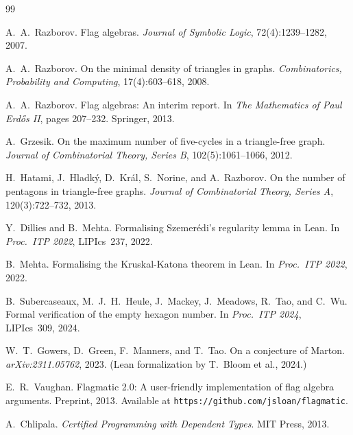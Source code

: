 \documentclass{article}
\begin{document}

\begin{thebibliography}{99}

A.~A.~Razborov.
\newblock Flag algebras.
\newblock \textit{Journal of Symbolic Logic}, 72(4):1239--1282, 2007.

A.~A.~Razborov.
\newblock On the minimal density of triangles in graphs.
\newblock \textit{Combinatorics, Probability and Computing},
  17(4):603--618, 2008.

A.~A.~Razborov.
\newblock Flag algebras: An interim report.
\newblock In \textit{The Mathematics of Paul Erd\H{o}s II}, pages 207--232.
  Springer, 2013.

A.~Grzesik.
\newblock On the maximum number of five-cycles in a triangle-free graph.
\newblock \textit{Journal of Combinatorial Theory, Series B},
  102(5):1061--1066, 2012.

H.~Hatami, J.~Hladk\'{y}, D.~Kr\'{a}l, S.~Norine, and A.~Razborov.
\newblock On the number of pentagons in triangle-free graphs.
\newblock \textit{Journal of Combinatorial Theory, Series A},
  120(3):722--732, 2013.

Y.~Dillies and B.~Mehta.
\newblock Formalising Szemer\'{e}di's regularity lemma in Lean.
\newblock In \textit{Proc.\ ITP 2022}, LIPIcs~237, 2022.

B.~Mehta.
\newblock Formalising the Kruskal-Katona theorem in Lean.
\newblock In \textit{Proc.\ ITP 2022}, 2022.

B.~Subercaseaux, M.~J.~H.~Heule, J.~Mackey, J.~Meadows, R.~Tao, and
  C.~Wu.
\newblock Formal verification of the empty hexagon number.
\newblock In \textit{Proc.\ ITP 2024}, LIPIcs~309, 2024.

W.~T.~Gowers, D.~Green, F.~Manners, and T.~Tao.
\newblock On a conjecture of Marton.
\newblock \textit{arXiv:2311.05762}, 2023.
\newblock (Lean formalization by T.~Bloom et al., 2024.)

E.~R.~Vaughan.
\newblock Flagmatic 2.0: A user-friendly implementation of flag algebra
  arguments.
\newblock Preprint, 2013. Available at \texttt{https://github.com/jsloan/flagmatic}.

A.~Chlipala.
\newblock \textit{Certified Programming with Dependent Types}.
\newblock MIT Press, 2013.


\end{thebibliography}
\end{document}
